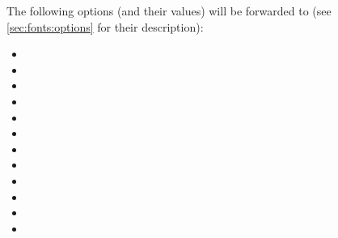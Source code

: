 The following options (and their values) will be forwarded to 
(see \autoref{sec:fonts:options} for their description):
\begingroup
\multicolsep=0pt
\premulticols=0pt
\begin{multicols}{4}
\begin{itemize}
  \item {}
  \item {}
  \item {}
  \item {}
  \item {}
  \item {}
  \item {}
  \item {}
  \item {}
  \item {}
  \item {}
  \item {}
\end{itemize}
\end{multicols}
\endgroup
